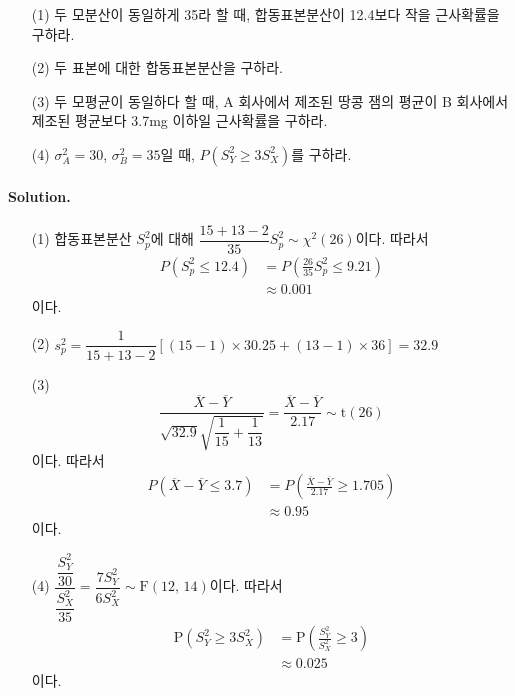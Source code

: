 \begin{itemize}
    \item[(1)] 두 모분산이 동일하게 35라 할 때, 합동표본분산이 12.4보다 작을 근사확률을 구하라.
    \item[(2)] 두 표본에 대한 합동표본분산을 구하라.
    \item[(3)] 두 모평균이 동일하다 할 때, A 회사에서 제조된 땅콩 잼의 평균이 B 회사에서 제조된 평균보다 3.7mg 이하일 근사확률을 구하라.
    \item[(4)] $\sigma_A^2=30$, $\sigma_B^2=35$일 때, $P\left(S_Y^2 \geq 3S_X^2\right)$를 구하라.   
\end{itemize}

\paragraph{Solution.}

\begin{itemize}
    \item[(1)] {
        합동표본분산 $S_p^2$에 대해 $\dfrac{15+13-2}{35}S_p^2 \sim \chi^2\left(26\right)$이다. 따라서
        \begin{align*}
            P\left( S_p^2\leq12.4 \right) &= P\left( \frac{26}{35}S_p^2\leq9.21 \right) \\
            &\approx 0.001
        \end{align*}
        이다.
    }
    \item[(2)] {
        $s_p^2=\dfrac{1}{15+13-2}\left[\left(15-1\right)\times30.25+\left(13-1\right)\times36\right]=32.9$
    }
    \item[(3)] {
        \[\frac{\overline{X}-\overline{Y}}{\sqrt{32.9}\sqrt{\dfrac{1}{15}+\dfrac{1}{13}}}=\frac{\overline{X}-\overline{Y}}{2.17}\sim\mathrm{t}\left(26\right)\]
        이다. 따라서
        \begin{align*}
            P\left(\overline{X}-\overline{Y} \leq 3.7\right) &= P\left(\frac{\overline{X}-\overline{Y}}{2.17}\geq 1.705\right) \\
            &\approx 0.95
        \end{align*}
        이다.
    }
    \item[(4)] {
        $\dfrac{\dfrac{S_Y^2}{30}}{\dfrac{S_X^2}{35}}=\dfrac{7S_Y^2}{6S_X^2}\sim \mathrm{F}\left(12,\,14\right)$이다. 따라서
        \begin{align*}
            \mathrm{P}\left(S_Y^2 \geq 3S_X^2\right) &= \mathrm{P}\left(\frac{S_Y^2}{S_X^2} \geq 3\right) \\
            &\approx 0.025
        \end{align*}
        이다.
    }
\end{itemize}

